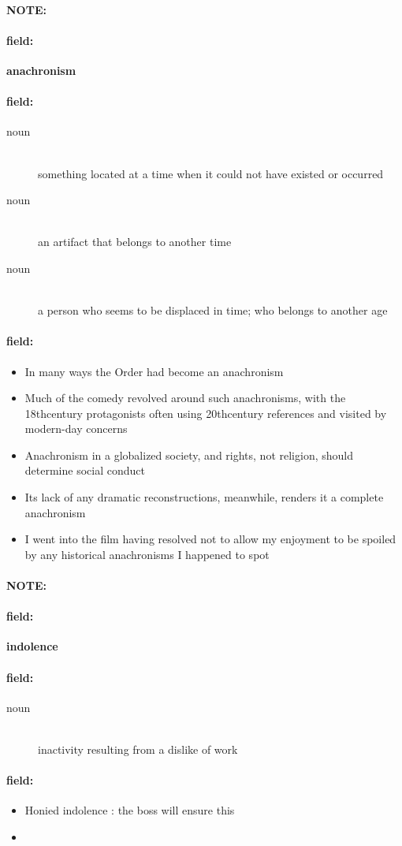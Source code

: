 \documentclass[12pt]{article}
\newenvironment{note}{\paragraph{NOTE:}}{}
\newenvironment{field}{\paragraph{field:}}{}
\begin{document}
\begin{note}
\begin{field}
\textbf{\large anachronism}
\end{field}


\begin{field}
\begin{description}
\item[noun] \hfill \\ 
something located at a time when it could not have existed or occurred

\item[noun] \hfill \\ 
an artifact that belongs to another time

\item[noun] \hfill \\ 
a person who seems to be displaced in time; who belongs to another age

\end{description}
\end{field}

\begin{field}
\begin{itemize}
\item In many ways the Order had become an anachronism
\item Much of the comedy revolved around such anachronisms, with the 18thcentury protagonists often using 20thcentury references and visited by modern-day concerns
\item Anachronism in a globalized society, and rights, not religion, should determine social conduct
\item Its lack of any dramatic reconstructions, meanwhile, renders it a complete anachronism
\item I went into the film having resolved not to allow my enjoyment to be spoiled by any historical anachronisms I happened to spot
\end{itemize}
\end{field}
\end{note}
\begin{note}
\begin{field}
\textbf{\large indolence}
\end{field}


\begin{field}
\begin{description}
\item[noun] \hfill \\ 
inactivity resulting from a dislike of work

\end{description}
\end{field}

\begin{field}
\begin{itemize}
\item Honied indolence : the boss will ensure this
\item 
\end{itemize}
\end{field}
\end{note}
\end{document}
